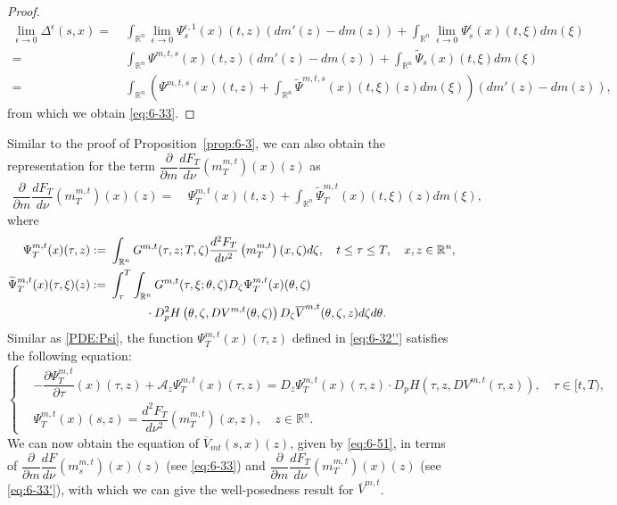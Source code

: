 \documentclass[11pt]{article}
\numberwithin{equation}{section}
\newcommand{\brn}{{\mathbb{R}^n}}
\newcommand{\de}{\Delta}
\newcommand{\1}{\mbox{1\hspace{-1mm}I}}
\begin{document}
\begin{proof}
\begin{align*}
    \lim_{\epsilon\to 0}\de^{\epsilon}(s,x)=\ & \int_{\brn} \lim_{\epsilon\to 0} \Psi_{s}^{\epsilon,1}(x)(t,z)\left(dm'(z)-dm(z)\right)+\int_{\brn} \lim_{\epsilon\to 0}\Psi_{s}^{\epsilon}(x)(t,\xi) dm(\xi)\\
    =\ & \int_{\brn} \Psi^{m,t,s}(x)(t,z)(dm'(z)-dm(z))+ \int_{\brn} \widetilde{\Psi}_{s}(x)(t,\xi) dm(\xi)\\
    =\ & \int_{\brn}\left(\Psi^{m,t,s}(x)(t,z)+\int_{\brn}\widetilde{\Psi}^{m,t,s}(x)(t,\xi)(z)dm(\xi)\right)(dm'(z)-dm(z)),
\end{align*}
from which we obtain \eqref{eq:6-33}. 
\end{proof}

Similar to the proof of Proposition~\ref{prop:6-3}, we can also obtain the representation for the term $\dfrac{\partial}{\partial m}\dfrac{d F_{T}}{d\nu}\left(m^{m,t}_T\right)(x)(z)$ as
\begin{align}
    \dfrac{\partial}{\partial m}\dfrac{dF_T}{d\nu}\left(m^{m,t}_T\right)(x)(z)=\ & \Psi^{m,t}_T(x)(t,z)+\int_{\brn}\widetilde{\Psi}^{m,t}_T(x)(t,\xi)(z)dm(\xi), \label{eq:6-33'}
\end{align}
where 
\begin{align}
    \Psi^{m,t}_T(x)(\tau,z):=\ & \int_{\brn}G^{m,t}(\tau,z;T,\zeta)\dfrac{d^{2}F_T}{d\nu^{2}}\left(m^{m,t}_T\right)(x,\zeta)d\zeta, \quad t\le\tau\le T,\quad x,z\in\brn,\label{eq:6-32''} \\
    \widetilde{\Psi}^{m,t}_T(x)(\tau,\xi)(z):=\ & \int_{\tau}^{T}\int_{\brn}G^{m,t}(\tau,\xi;\theta,\zeta)D_{\zeta}\Psi^{m,t}_T(x)(\theta,\zeta) \notag \\
    &\quad\qquad \cdot D_{p}^{2}H\left(\theta,\zeta,DV^{m,t}(\theta,\zeta)\right)D_{\zeta} \overline{V}^{m,t}(\theta,\zeta,z)d\zeta d\theta. \label{eq:6-32'''}
\end{align}
Similar as \eqref{PDE:Psi}, the function $\Psi^{m,t}_T(x)(\tau,z)$ defined in \eqref{eq:6-32''} satisfies the following equation: 
\begin{equation}\label{PDE:Psi_T}
\left\{
\begin{aligned}
    &-\dfrac{\partial \Psi^{m,t}_T}{\partial\tau}(x)(\tau,z) +\mathcal{A}_{z} \Psi^{m,t}_T(x)(\tau,z) =D_{z}\Psi^{m,t}_T(x)(\tau,z) \cdot D_p H\left(\tau,z,DV^{m,t}(\tau,z)\right),\quad \tau\in[t,T),\\
    &\Psi^{m,t}_T(x)(s,z)=\dfrac{d^{2}F_T}{d\nu^{2}}\left(m^{m,t}_T\right)(x,z),\quad z\in\brn.
\end{aligned}
\right.
\end{equation}
We can now obtain the equation of $\overline{V}_{mt}(s,x)(z)$, given by \eqref{eq:6-51}, in terms of $\dfrac{\partial}{\partial m}\dfrac{dF}{d\nu}\left(m^{m,t}_s\right)(x)(z)$ (see \eqref{eq:6-33}) and $\dfrac{\partial}{\partial m}\dfrac{dF_{T}}{d\nu}\left(m^{m,t}_T\right)(x)(z)$ (see \eqref{eq:6-33'}), with which we can give the well-posedness result for $\overline{V}^{m,t}$.
\end{document}
